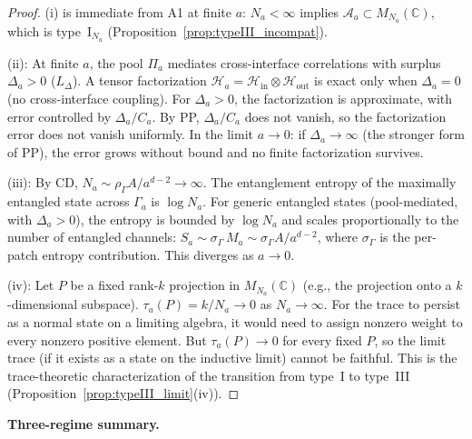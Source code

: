 \documentclass[11pt,a4paper]{article}
\theoremstyle{definition}
\begin{document}
\begin{proof}
(i) is immediate from A1 at finite $a$: $N_a < \infty$ implies
$\mathcal{A}_a \subset M_{N_a}(\mathbb{C})$, which is type~I$_{N_a}$
(Proposition~\ref{prop:typeIII_incompat}).

(ii): At finite $a$, the pool $\Pi_a$ mediates cross-interface
correlations with surplus $\Delta_a > 0$ ($L_\Delta$).  A tensor
factorization $\mathcal{H}_a = \mathcal{H}_{\mathrm{in}} \otimes
\mathcal{H}_{\mathrm{out}}$ is exact only when $\Delta_a = 0$
(no cross-interface coupling).  For $\Delta_a > 0$, the factorization
is approximate, with error controlled by $\Delta_a / C_a$.  By PP,
$\Delta_a / C_a$ does not vanish, so the factorization error does not
vanish uniformly.  In the limit $a \to 0$: if $\Delta_a \to \infty$
(the stronger form of PP), the error grows without bound and no
finite factorization survives.

(iii): By CD, $N_a \sim \rho_\Gamma A / a^{d-2} \to \infty$.  The
entanglement entropy of the maximally entangled state across $\Gamma_a$
is $\log N_a$.  For generic entangled states (pool-mediated, with
$\Delta_a > 0$), the entropy is bounded by $\log N_a$ and scales
proportionally to the number of entangled channels:
$S_a \sim \sigma_\Gamma\, M_a \sim \sigma_\Gamma A / a^{d-2}$,
where $\sigma_\Gamma$ is the per-patch entropy contribution.  This
diverges as $a \to 0$.

(iv): Let $P$ be a fixed rank-$k$ projection in $M_{N_a}(\mathbb{C})$
(e.g., the projection onto a $k$-dimensional subspace).
$\tau_a(P) = k / N_a \to 0$ as $N_a \to \infty$.  For the trace to
persist as a normal state on a limiting algebra, it would need to
assign nonzero weight to every nonzero positive element.  But
$\tau_a(P) \to 0$ for every fixed $P$, so the limit trace (if it
exists as a state on the inductive limit) cannot be faithful.  This
is the trace-theoretic characterization of the transition from
type~I to type~III
(Proposition~\ref{prop:typeIII_limit}(iv)).
\end{proof}

\smallskip\noindent\textbf{Three-regime summary.}\quad
\end{document}
